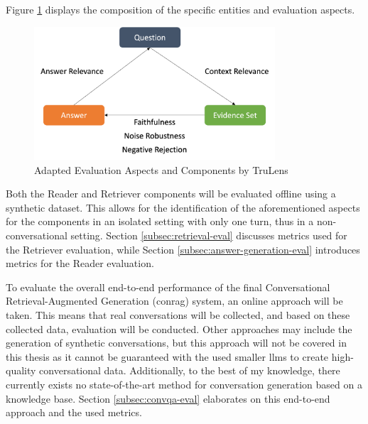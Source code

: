 Figure \ref{fig:evaluation-dimensions} displays the composition of the specific entities and evaluation aspects.

\begin{figure}[H]
    \centering
    \includegraphics[width=0.8\textwidth]{Grafiken/Evaluation_Dimensions_RAGAS_Turelens.png}
    \caption{Adapted Evaluation Aspects and Components by TruLens \cite{noauthor_truelens}}
    \label{fig:evaluation-dimensions}
\end{figure}

Both the Reader and Retriever components will be evaluated offline using a synthetic dataset. This allows for the identification of the aforementioned aspects for the components in an isolated setting with only one turn, thus in a non-conversational setting. Section \ref{subsec:retrieval-eval} discusses metrics used for the Retriever evaluation, while Section \ref{subsec:answer-generation-eval} introduces metrics for the Reader evaluation.

To evaluate the overall end-to-end performance of the final Conversational Retrieval-Augmented Generation (\gls{conrag}) system, an online approach will be taken. This means that real conversations will be collected, and based on these collected data, evaluation will be conducted. Other approaches may include the generation of synthetic conversations, but this approach will not be covered in this thesis as it cannot be guaranteed with the used smaller \gls{llm}s to create high-quality conversational data. Additionally, to the best of my knowledge, there currently exists no state-of-the-art method for conversation generation based on a knowledge base. Section \ref{subsec:convqa-eval} elaborates on this end-to-end approach and the used metrics.


